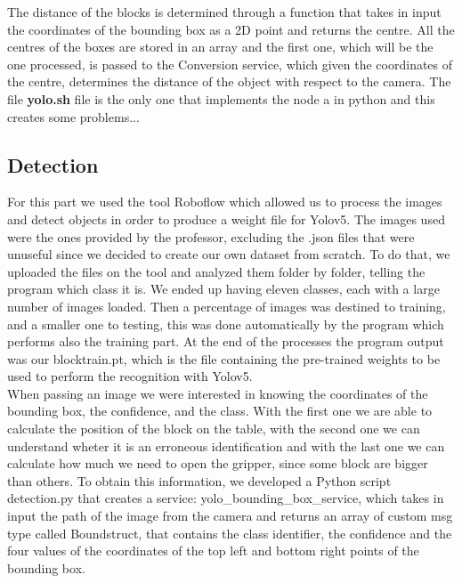 \documentclass[12pt,a4paper]{article}
\begin{document}
\begin{itemize}
    The distance of the blocks is determined through a function that takes in input the coordinates of the bounding box as a 2D point and returns the centre. All the centres of the boxes are stored in an array and the first one, which will be the one processed, is passed to the Conversion service, which given the coordinates of the centre, determines the distance of the object with respect to the camera.
    The file \textbf{yolo.sh} file is the only one that implements the node a in python and this creates some problems...
\end{itemize}

\subsection{Detection}\label{subsec:detect}
For this part we used the tool Roboflow which allowed us to process the images and detect objects in order to produce a weight file for Yolov5. The images used were the ones provided by the professor, excluding the .json files that were unuseful since we decided to create our own dataset from scratch. To do that, we uploaded the files on the tool and analyzed them folder by folder, telling the program which class it is. We ended up having eleven classes, each with a large number of images loaded. Then a percentage of images was destined to training, and a smaller one to testing, this was done automatically by the program which performs also the training part. At the end of the processes the program output was our blocktrain.pt, which is the file containing the pre-trained weights to be used to perform the recognition with Yolov5.\\
When passing an image we were interested in knowing the coordinates of the bounding box, the confidence, and the class. With the first one we are able to calculate the position of the block on the table, with the second one we can understand wheter it is an erroneous identification and with the last one we can calculate how much we need to open the gripper, since some block are bigger than others. To obtain this information, we developed a Python script detection.py that creates a service: yolo\_bounding\_box\_service, which takes in input the path of the image from the camera and returns an array of custom msg type called Boundstruct, that contains the class identifier, the confidence and the four values of the coordinates of the top left and bottom right points of the bounding box.
\end{document}
